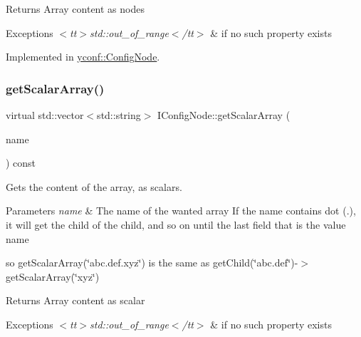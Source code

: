 \begin{DoxyReturn}{Returns}
Array content as nodes 
\end{DoxyReturn}

\begin{DoxyExceptions}{Exceptions}
{\em $<$tt$>$std\+::out\+\_\+of\+\_\+range$<$/tt$>$} & if no such property exists \\
\hline
\end{DoxyExceptions}


Implemented in \hyperlink{classyconf_1_1ConfigNode_a3f590d4507699b6f9a9f3ca336f95255}{yconf\+::\+Config\+Node}.

\mbox{\label{classIConfigNode_aaa66c9d23d521b5b5c9f5f6bf35087fb}} 
\subsubsection{\texorpdfstring{get\+Scalar\+Array()}{getScalarArray()}}
{\footnotesize\ttfamily virtual std\+::vector$<$std\+::string$>$ I\+Config\+Node\+::get\+Scalar\+Array (\begin{DoxyParamCaption}\item[{const std\+::string \&}]{name }\end{DoxyParamCaption}) const\hspace{0.3cm}{\ttfamily [pure virtual]}}



Gets the content of the array, as scalars. 


\begin{DoxyParams}{Parameters}
{\em name} & The name of the wanted array If the name contains dot ({\ttfamily .}), it will get the child of the child, and so on until the last field that is the value name\\
\hline
\end{DoxyParams}
so {\ttfamily get\+Scalar\+Array(\char`\"{}abc.\+def.\+xyz\char`\"{})} is the same as {\ttfamily get\+Child(\char`\"{}abc.\+def\char`\"{})-\/$>$get\+Scalar\+Array(\char`\"{}xyz\char`\"{})}

\begin{DoxyReturn}{Returns}
Array content as scalar 
\end{DoxyReturn}

\begin{DoxyExceptions}{Exceptions}
{\em $<$tt$>$std\+::out\+\_\+of\+\_\+range$<$/tt$>$} & if no such property exists \\
\hline
\end{DoxyExceptions}


